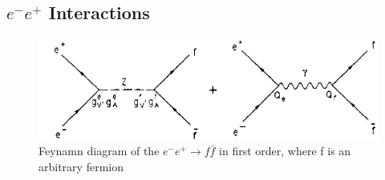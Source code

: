 \subsection{$e^-e^+$ Interactions}
\begin{figure}[ht]
	\centering
	\includegraphics{graphics/annihilation.png}
	\caption{Feynamn diagram of the $e^-e^+ \rightarrow f\bar{f}$ in first order, where f is an arbitrary fermion}
	\label{fig:principles:annihilation.png}
\end{figure}

